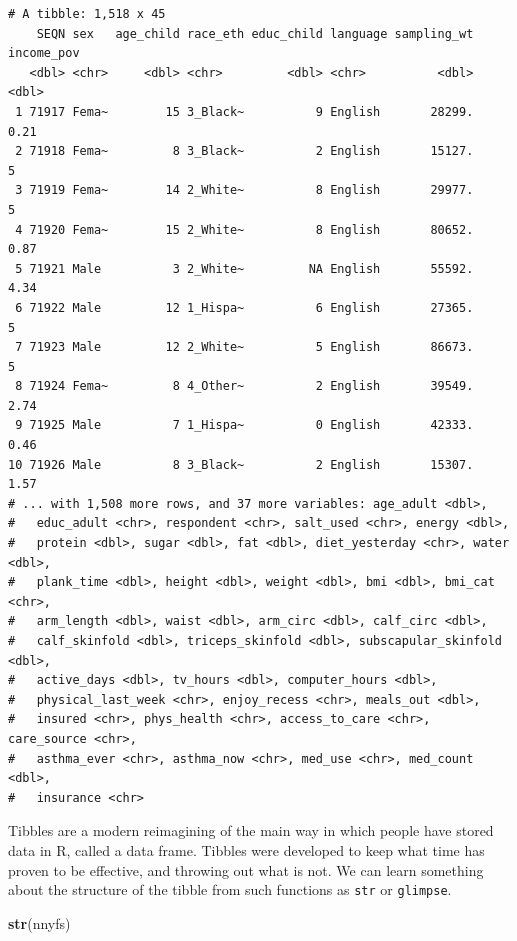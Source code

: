 \documentclass[
]{book}
\newenvironment{Shaded}{\begin{snugshade}}{\end{snugshade}}
\newcommand{\KeywordTok}[1]{\textcolor[rgb]{0.13,0.29,0.53}{\textbf{#1}}}
\newcommand{\NormalTok}[1]{#1}
\begin{document}
\begin{verbatim}
# A tibble: 1,518 x 45
    SEQN sex   age_child race_eth educ_child language sampling_wt income_pov
   <dbl> <chr>     <dbl> <chr>         <dbl> <chr>          <dbl>      <dbl>
 1 71917 Fema~        15 3_Black~          9 English       28299.       0.21
 2 71918 Fema~         8 3_Black~          2 English       15127.       5   
 3 71919 Fema~        14 2_White~          8 English       29977.       5   
 4 71920 Fema~        15 2_White~          8 English       80652.       0.87
 5 71921 Male          3 2_White~         NA English       55592.       4.34
 6 71922 Male         12 1_Hispa~          6 English       27365.       5   
 7 71923 Male         12 2_White~          5 English       86673.       5   
 8 71924 Fema~         8 4_Other~          2 English       39549.       2.74
 9 71925 Male          7 1_Hispa~          0 English       42333.       0.46
10 71926 Male          8 3_Black~          2 English       15307.       1.57
# ... with 1,508 more rows, and 37 more variables: age_adult <dbl>,
#   educ_adult <chr>, respondent <chr>, salt_used <chr>, energy <dbl>,
#   protein <dbl>, sugar <dbl>, fat <dbl>, diet_yesterday <chr>, water <dbl>,
#   plank_time <dbl>, height <dbl>, weight <dbl>, bmi <dbl>, bmi_cat <chr>,
#   arm_length <dbl>, waist <dbl>, arm_circ <dbl>, calf_circ <dbl>,
#   calf_skinfold <dbl>, triceps_skinfold <dbl>, subscapular_skinfold <dbl>,
#   active_days <dbl>, tv_hours <dbl>, computer_hours <dbl>,
#   physical_last_week <chr>, enjoy_recess <chr>, meals_out <dbl>,
#   insured <chr>, phys_health <chr>, access_to_care <chr>, care_source <chr>,
#   asthma_ever <chr>, asthma_now <chr>, med_use <chr>, med_count <dbl>,
#   insurance <chr>
\end{verbatim}

Tibbles are a modern reimagining of the main way in which people have stored data in R, called a data frame. Tibbles were developed to keep what time has proven to be effective, and throwing out what is not. We can learn something about the structure of the tibble from such functions as \texttt{str} or \texttt{glimpse}.

\begin{Shaded}
\begin{Highlighting}[]
\KeywordTok{str}\NormalTok{(nnyfs)}
\end{Highlighting}
\end{Shaded}
\end{document}
